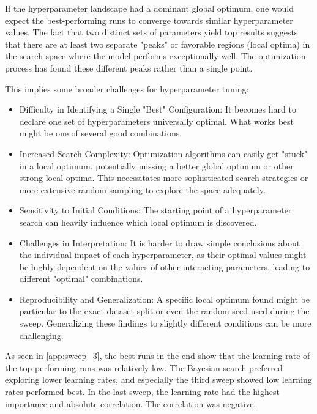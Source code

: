If the hyperparameter landscape had a dominant global optimum, one would expect the best-performing runs to converge towards similar hyperparameter values. The fact that two distinct sets of parameters yield top results suggests that there are at least two separate "peaks" or favorable regions (local optima) in the search space where the model performs exceptionally well. The optimization process has found these different peaks rather than a single point.

This implies some broader challenges for hyperparameter tuning:

\begin{itemize}
    \item Difficulty in Identifying a Single "Best" Configuration: It becomes hard to declare one set of hyperparameters universally optimal. What works best might be one of several good combinations.
    \item Increased Search Complexity: Optimization algorithms can easily get "stuck" in a local optimum, potentially missing a better global optimum or other strong local optima. This necessitates more sophisticated search strategies or more extensive random sampling to explore the space adequately.
    \item Sensitivity to Initial Conditions: The starting point of a hyperparameter search can heavily influence which local optimum is discovered.
    \item Challenges in Interpretation: It is harder to draw simple conclusions about the individual impact of each hyperparameter, as their optimal values might be highly dependent on the values of other interacting parameters, leading to different "optimal" combinations.
    \item Reproducibility and Generalization: A specific local optimum found might be particular to the exact dataset split or even the random seed used during the sweep. Generalizing these findings to slightly different conditions can be more challenging.
\end{itemize}



As seen in \autoref{app:sweep_3}, the best runs in the end show that the learning rate of the top-performing runs was relatively low. The Bayesian search preferred exploring lower learning rates, and especially the third sweep showed low learning rates performed best. In the last sweep, the learning rate had the highest importance and absolute correlation. The correlation was negative. 

